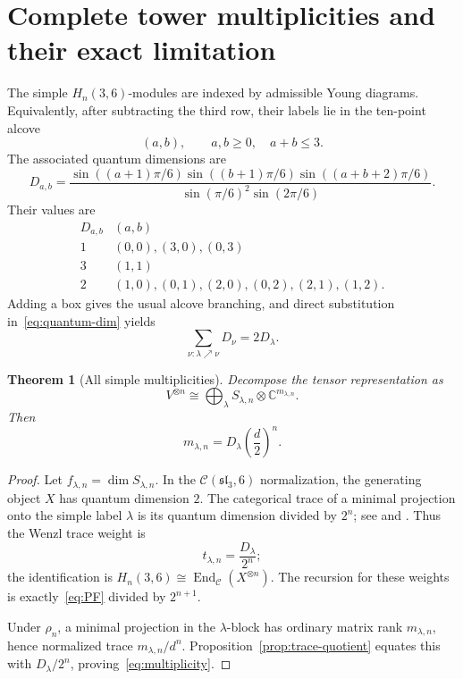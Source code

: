 \documentclass[11pt]{article}
\newtheorem{theorem}{Theorem}[section]
\theoremstyle{definition}
\theoremstyle{remark}
\newcommand{\End}{\operatorname{End}}
\newcommand{\bbC}{\mathbb C}
\newcommand{\cC}{\mathcal C}
\begin{document}
\section{Complete tower multiplicities and their exact limitation}
\label{sec:multiplicities}

The simple \(H_n(3,6)\)-modules are indexed by admissible Young diagrams.
Equivalently, after subtracting the third row, their labels lie in the
ten-point alcove
\[
  (a,b),\qquad a,b\ge0,\quad a+b\le3.
\]
The associated quantum dimensions are
\begin{equation}
 D_{a,b}=
 \frac{
  \sin((a+1)\pi/6)\sin((b+1)\pi/6)
  \sin((a+b+2)\pi/6)}
 {\sin(\pi/6)^2\sin(2\pi/6)}.
 \label{eq:quantum-dim}
\end{equation}
Their values are
\[
\begin{array}{c|c}
D_{a,b}&(a,b)\\ \hline
1&(0,0),(3,0),(0,3)\\
3&(1,1)\\
2&(1,0),(0,1),(2,0),(0,2),(2,1),(1,2).
\end{array}
\]
Adding a box gives the usual alcove branching, and direct substitution
in~\eqref{eq:quantum-dim} yields
\begin{equation}
  \sum_{\nu:\lambda\nearrow\nu}D_\nu=2D_\lambda.
  \label{eq:PF}
\end{equation}

\begin{theorem}[All simple multiplicities]\label{thm:multiplicities}
Decompose the tensor representation as
\[
  V^{\otimes n}
  \cong
  \bigoplus_\lambda
  S_{\lambda,n}\otimes\bbC^{m_{\lambda,n}}.
\]
Then
\begin{equation}
  \boxed{
  m_{\lambda,n}
  =D_\lambda\left(\frac d2\right)^n.}
  \label{eq:multiplicity}
\end{equation}
\end{theorem}

\begin{proof}
Let \(f_{\lambda,n}=\dim S_{\lambda,n}\). In the
\(\cC(\mathfrak{sl}_3,6)\) normalization, the generating object \(X\)
has quantum dimension \(2\). The categorical trace of a minimal
projection onto the simple label \(\lambda\) is its quantum dimension
divided by \(2^n\); see
\cite[\S5.6]{GHR2013} and \cite[\S\S2--3]{Wenzl1988}. Thus the Wenzl
trace weight is
\[
  t_{\lambda,n}=\frac{D_\lambda}{2^n};
\]
the identification is
\(H_n(3,6)\cong\End_{\cC}(X^{\otimes n})\). The recursion for these
weights is exactly~\eqref{eq:PF} divided by \(2^{n+1}\).

Under \(\rho_n\), a minimal projection in the \(\lambda\)-block has
ordinary matrix rank \(m_{\lambda,n}\), hence normalized trace
\(m_{\lambda,n}/d^n\). Proposition~\ref{prop:trace-quotient} equates this
with \(D_\lambda/2^n\), proving~\eqref{eq:multiplicity}.
\end{proof}
\end{document}
